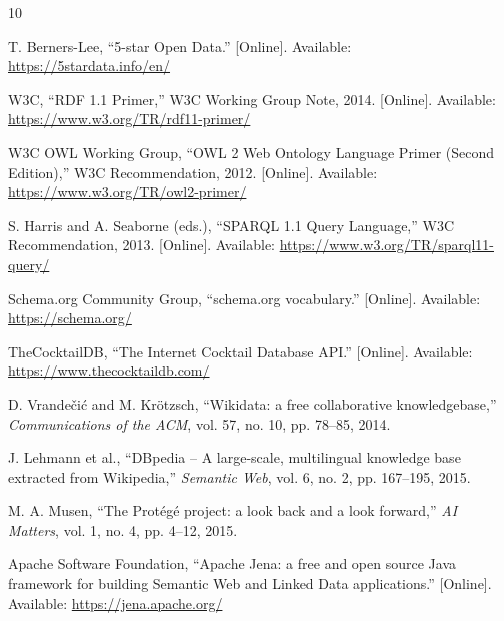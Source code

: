 
\begin{thebibliography}{10}

 T. Berners-Lee, ``5-star Open Data.'' [Online]. Available:
\url{https://5stardata.info/en/}

 W3C, ``RDF 1.1 Primer,'' W3C Working Group Note, 2014.
[Online]. Available: \url{https://www.w3.org/TR/rdf11-primer/}

 W3C OWL Working Group, ``OWL 2 Web Ontology Language Primer
(Second Edition),'' W3C Recommendation, 2012. [Online]. Available:
\url{https://www.w3.org/TR/owl2-primer/}

 S. Harris and A. Seaborne (eds.), ``SPARQL 1.1 Query
Language,'' W3C Recommendation, 2013. [Online]. Available:
\url{https://www.w3.org/TR/sparql11-query/}

 Schema.org Community Group, ``schema.org vocabulary.''
[Online]. Available: \url{https://schema.org/}

 TheCocktailDB, ``The Internet Cocktail Database API.''
[Online]. Available: \url{https://www.thecocktaildb.com/}

 D. Vrande\v{c}i\'{c} and M. Kr\"{o}tzsch, ``Wikidata: a free
collaborative knowledgebase,'' \emph{Communications of the ACM}, vol. 57,
no. 10, pp. 78--85, 2014.

 J. Lehmann et al., ``DBpedia -- A large-scale, multilingual
knowledge base extracted from Wikipedia,'' \emph{Semantic Web}, vol. 6, no. 2,
pp. 167--195, 2015.

 M. A. Musen, ``The Prot\'{e}g\'{e} project: a look back and a
look forward,'' \emph{AI Matters}, vol. 1, no. 4, pp. 4--12, 2015.

 Apache Software Foundation, ``Apache Jena: a free and open
source Java framework for building Semantic Web and Linked Data
applications.'' [Online]. Available: \url{https://jena.apache.org/}

\end{thebibliography}
